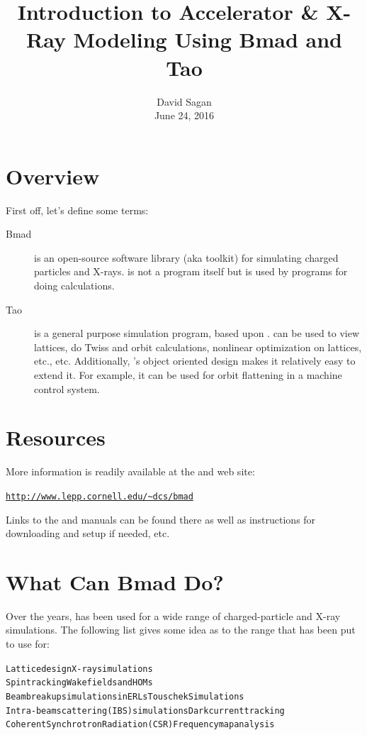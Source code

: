 \documentclass{hitec}
\title{Introduction to Accelerator \& X-Ray Modeling Using Bmad and Tao}
\author{}
\date{David Sagan \\ June 24, 2016}
\newcommand{\Section}[1]{\section{#1}\vspace*{-1ex}}
\newenvironment{display}
  {\vspace*{-1.5ex} \begin{alltt}}
  {\end{alltt} \vspace*{-1.0ex}}
\begin{document}
\maketitle


\Section{Overview}
\label{s:overview}

First off, let's define some terms:
  \begin{description}
  \item[Bmad] \Newline
\bmad is an open-source software library (aka toolkit) for simulating charged particles
and X-rays. \bmad is not a program itself but is used by programs for doing
calculations. 
  \item[Tao] \Newline
\tao is a general purpose simulation program, based upon \bmad. \tao can be used to view
lattices, do Twiss and orbit calculations, nonlinear optimization on lattices, etc., etc.
Additionally, \tao's object oriented design makes it relatively easy to extend it. For
example, it can be used for orbit flattening in a machine control system.
  \end{description}

\Section{Resources}
\label{s:resources}

More information is readily available at the \bmad and \tao web site:
\begin{display}
  \url{http://www.lepp.cornell.edu/~dcs/bmad}
\end{display}
Links to the \bmad and \tao manuals can be found there as well as instructions for
downloading and setup if needed, etc.

\Section{What Can Bmad Do?}

Over the years, \bmad has been used for a wide range of charged-particle and X-ray
simulations. The following list gives some idea as to the range that \bmad has been put to use
for:
\begin{display}
  Lattice design                              X-ray simulations
  Spin tracking                               Wakefields and HOMs
  Beam breakup simulations in ERLs            Touschek Simulations
  Intra-beam scattering (IBS) simulations     Dark current tracking
  Coherent Synchrotron Radiation (CSR)        Frequency map analysis
\end{display}
\end{document}
